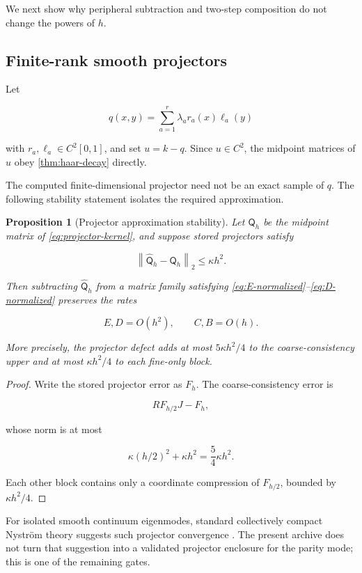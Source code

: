 \documentclass[11pt]{article}
\newtheorem{proposition}[theorem]{Proposition}
\theoremstyle{definition}
\theoremstyle{remark}
\newcommand{\norm}[1]{\left\lVert #1\right\rVert}
\begin{document}
We next show why peripheral subtraction and two-step composition do not
change the powers of $h$.

\subsection{Finite-rank smooth projectors}

Let

\begin{equation}
q(x,y)=\sum_{a=1}^r\lambda_a r_a(x)\ell_a(y)
\label{eq:projector-kernel}
\end{equation}

with $r_a,\ell_a\in C^2[0,1]$, and set $u=k-q$.  Since $u\in C^2$, the
midpoint matrices of $u$ obey \cref{thm:haar-decay} directly.

The computed finite-dimensional projector need not be an exact sample of
$q$.  The following stability statement isolates the required approximation.

\begin{proposition}[Projector approximation stability]
\label{prop:projector}
Let $\mathsf Q_h$ be the midpoint matrix of \eqref{eq:projector-kernel}, and
suppose stored projectors satisfy

\[
\norm{\widehat{\mathsf Q}_h-\mathsf Q_h}_2\le\kappa h^2.
\]

Then subtracting $\widehat{\mathsf Q}_h$ from a matrix family satisfying
\eqref{eq:E-normalized}--\eqref{eq:D-normalized} preserves the rates

\[
E,D=O(h^2),\qquad C,B=O(h).
\]

More precisely, the projector defect adds at most $5\kappa h^2/4$ to the
coarse-consistency upper and at most $\kappa h^2/4$ to each fine-only block.
\end{proposition}

\begin{proof}
Write the stored projector error as $F_h$.  The coarse-consistency error is

\[
RF_{h/2}J-F_h,
\]

whose norm is at most

\[
\kappa(h/2)^2+\kappa h^2=\frac54\kappa h^2.
\]

Each other block contains only a coordinate compression of $F_{h/2}$, bounded
by $\kappa h^2/4$.
\end{proof}

For isolated smooth continuum eigenmodes, standard collectively compact
Nystr\"om theory suggests such projector convergence
\citep{Atkinson1997,Kato1995,WangContinuum2026}.  The present archive does not
turn that suggestion into a validated projector enclosure for the parity
mode; this is one of the remaining gates.
\end{document}
